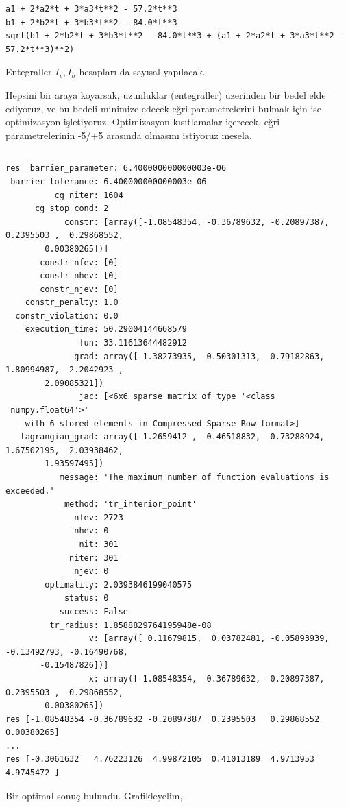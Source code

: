 \documentclass[12pt,fleqn]{article}\usepackage{../../common}
\begin{document}
\begin{verbatim}
a1 + 2*a2*t + 3*a3*t**2 - 57.2*t**3
b1 + 2*b2*t + 3*b3*t**2 - 84.0*t**3
sqrt(b1 + 2*b2*t + 3*b3*t**2 - 84.0*t**3 + (a1 + 2*a2*t + 3*a3*t**2 - 57.2*t**3)**2)
\end{verbatim}

Entegraller $I_v,I_h$ hesapları da sayısal yapılacak.

Hepsini bir araya koyarsak, uzunluklar (entegraller) üzerinden bir bedel
elde ediyoruz, ve bu bedeli minimize edecek eğri parametrelerini bulmak
için ise optimizasyon işletiyoruz. Optimizasyon kısıtlamalar içerecek, eğri
parametrelerinin -5/+5 arasında olmasını istiyoruz mesela.

\inputminted[fontsize=\footnotesize]{python}{paths2.py}

\begin{verbatim}
res  barrier_parameter: 6.400000000000003e-06
 barrier_tolerance: 6.400000000000003e-06
          cg_niter: 1604
      cg_stop_cond: 2
            constr: [array([-1.08548354, -0.36789632, -0.20897387,  0.2395503 ,  0.29868552,
        0.00380265])]
       constr_nfev: [0]
       constr_nhev: [0]
       constr_njev: [0]
    constr_penalty: 1.0
  constr_violation: 0.0
    execution_time: 50.29004144668579
               fun: 33.11613644482912
              grad: array([-1.38273935, -0.50301313,  0.79182863,  1.80994987,  2.2042923 ,
        2.09085321])
               jac: [<6x6 sparse matrix of type '<class 'numpy.float64'>'
	with 6 stored elements in Compressed Sparse Row format>]
   lagrangian_grad: array([-1.2659412 , -0.46518832,  0.73288924,  1.67502195,  2.03938462,
        1.93597495])
           message: 'The maximum number of function evaluations is exceeded.'
            method: 'tr_interior_point'
              nfev: 2723
              nhev: 0
               nit: 301
             niter: 301
              njev: 0
        optimality: 2.0393846199040575
            status: 0
           success: False
         tr_radius: 1.8588829764195948e-08
                 v: [array([ 0.11679815,  0.03782481, -0.05893939, -0.13492793, -0.16490768,
       -0.15487826])]
                 x: array([-1.08548354, -0.36789632, -0.20897387,  0.2395503 ,  0.29868552,
        0.00380265])
res [-1.08548354 -0.36789632 -0.20897387  0.2395503   0.29868552  0.00380265]
...
res [-0.3061632   4.76223126  4.99872105  0.41013189  4.9713953   4.9745472 ]
\end{verbatim}

Bir optimal sonuç bulundu. Grafikleyelim,
\end{document}
